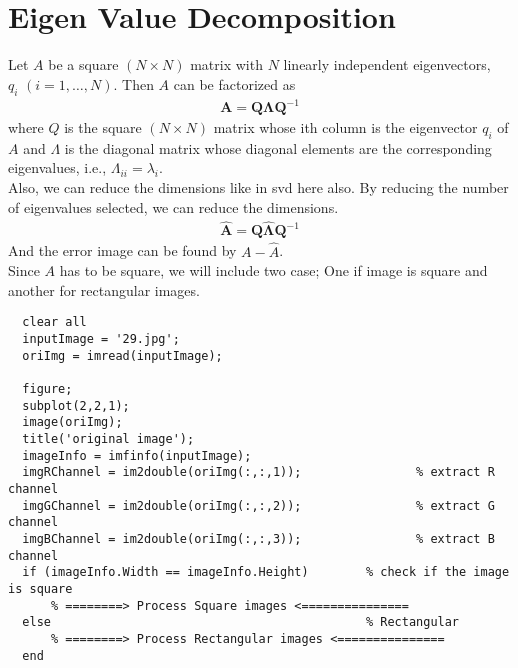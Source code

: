 \documentclass{article}
\begin{document}
\section{Eigen Value Decomposition}
Let $A$ be a square $(N\times N)$ matrix with $N$ linearly independent eigenvectors, $q_i \,\, (i = 1, \dots, N)$. Then $A$ can be factorized as
\begin{align}
    \mathbf{A}=\mathbf{Q}\mathbf{\Lambda}\mathbf{Q}^{-1}
\end{align}
where $Q$ is the square $(N\times N)$ matrix whose ith column is the eigenvector $q_i$ of $A$ and $\Lambda$ is the diagonal matrix whose diagonal elements are the corresponding eigenvalues, i.e., $\Lambda_{ii}=\lambda_i$.\\
Also, we can reduce the dimensions like in svd here also. By reducing the number of eigenvalues selected, we can reduce the dimensions.
\begin{align}
    \mathbf{\hat{A}}=\mathbf{Q}\mathbf{\hat{\Lambda}}\mathbf{Q}^{-1}
\end{align}
And the error image can be found by $A - \hat{A}$.\\
Since $A$ has to be square, we will include two case; One if image is square and another for rectangular images.
\begin{lstlisting}
  clear all
  inputImage = '29.jpg';
  oriImg = imread(inputImage);

  figure;
  subplot(2,2,1);
  image(oriImg);
  title('original image');
  imageInfo = imfinfo(inputImage);
  imgRChannel = im2double(oriImg(:,:,1));                % extract R channel
  imgGChannel = im2double(oriImg(:,:,2));                % extract G channel
  imgBChannel = im2double(oriImg(:,:,3));                % extract B channel
  if (imageInfo.Width == imageInfo.Height)        % check if the image is square
      % ========> Process Square images <===============
  else                                            % Rectangular
      % ========> Process Rectangular images <===============
  end
\end{lstlisting}
\end{document}
